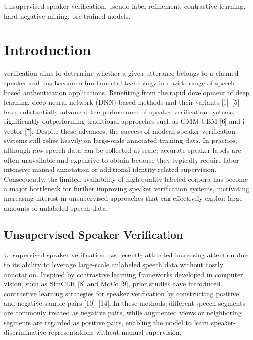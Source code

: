 \documentclass[lettersize,journal]{IEEEtran}
\begin{document}
\begin{IEEEkeywords}
Unsupervised speaker verification, pseudo-label refinement, contrastive learning, hard negative mining, pre-trained models.
\end{IEEEkeywords}

\section{Introduction}
 verification aims to determine whether a given utterance belongs to a claimed speaker and has become a fundamental technology in a wide range of speech-based authentication applications. Benefiting from the rapid development of deep learning, deep neural network (DNN)-based methods and their variants [1]--[5] have substantially advanced the performance of speaker verification systems, significantly outperforming traditional approaches such as GMM-UBM [6] and i-vector [7]. Despite these advances, the success of modern speaker verification systems still relies heavily on large-scale annotated training data. In practice, although raw speech data can be collected at scale, accurate speaker labels are often unavailable and expensive to obtain because they typically require labor-intensive manual annotation or additional identity-related supervision. Consequently, the limited availability of high-quality labeled corpora has become a major bottleneck for further improving speaker verification systems, motivating increasing interest in unsupervised approaches that can effectively exploit large amounts of unlabeled speech data.

\subsection{Unsupervised Speaker Verification}

Unsupervised speaker verification has recently attracted increasing attention due to its ability to leverage large-scale unlabeled speech data without costly annotation. Inspired by contrastive learning frameworks developed in computer vision, such as SimCLR [8] and MoCo [9], prior studies have introduced contrastive learning strategies for speaker verification by constructing positive and negative sample pairs [10]--[14]. In these methods, different speech segments are commonly treated as negative pairs, while augmented views or neighboring segments are regarded as positive pairs, enabling the model to learn speaker-discriminative representations without manual supervision.
\end{document}

